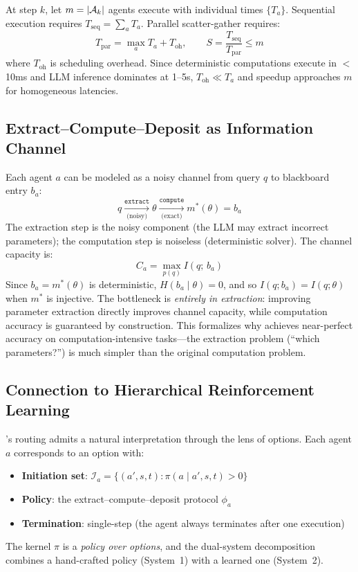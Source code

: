 \begin{proposition}
\label{prop:speedup}
At step $k$, let $m = |\mathcal{A}_k|$ agents execute with individual times $\{T_a\}$.  Sequential execution requires $T_\text{seq} = \sum_a T_a$.  Parallel scatter-gather requires:
\begin{equation}
    T_\text{par} = \max_a T_a + T_\text{oh}, \qquad S = \frac{T_\text{seq}}{T_\text{par}} \leq m
\end{equation}
where $T_\text{oh}$ is scheduling overhead.  Since deterministic computations execute in $<$10ms and LLM inference dominates at 1--5s, $T_\text{oh} \ll T_a$ and speedup approaches $m$ for homogeneous latencies.
\end{proposition}

\subsection{Extract--Compute--Deposit as Information Channel}
\label{app:channel}

Each agent $a$ can be modeled as a noisy channel from query $q$ to blackboard entry $b_a$:
\begin{equation}
    q \xrightarrow[\text{(noisy)}]{\texttt{extract}} \theta \xrightarrow[\text{(exact)}]{\texttt{compute}} m^*(\theta) = b_a
\end{equation}
The extraction step is the noisy component (the LLM may extract incorrect parameters); the computation step is noiseless (deterministic solver).  The channel capacity is:
\begin{equation}
    C_a = \max_{p(q)} I(q;\, b_a)
\end{equation}
Since $b_a = m^*(\theta)$ is deterministic, $H(b_a \mid \theta) = 0$, and so $I(q; b_a) = I(q; \theta)$ when $m^*$ is injective.  The bottleneck is \emph{entirely in extraction}: improving parameter extraction directly improves channel capacity, while computation accuracy is guaranteed by construction.  This formalizes why \starname{} achieves near-perfect accuracy on computation-intensive tasks---the extraction problem (``which parameters?'') is much simpler than the original computation problem.

\subsection{Connection to Hierarchical Reinforcement Learning}
\label{app:hrl}

\starname{}'s routing admits a natural interpretation through the lens of options.  Each agent $a$ corresponds to an option with:
\begin{itemize}
    \item \textbf{Initiation set}: $\mathcal{I}_a = \{(a',s,t): \pi(a \mid a',s,t) > 0\}$
    \item \textbf{Policy}: the extract--compute--deposit protocol $\phi_a$
    \item \textbf{Termination}: single-step (the agent always terminates after one execution)
\end{itemize}
The kernel $\pi$ is a \emph{policy over options}, and the dual-system decomposition combines a hand-crafted policy (System~1) with a learned one (System~2).

